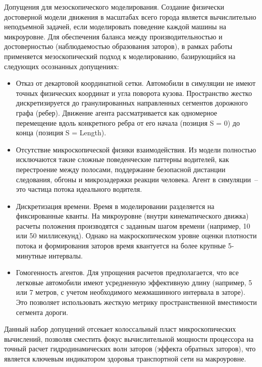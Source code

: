 Допущения для мезоскопического моделирования.
Создание физически достоверной модели движения в масштабах всего города является вычислительно неподъемной задачей, если моделировать поведение каждой машины на микроуровне. Для обеспечения баланса между производительностью и достоверностью (наблюдаемостью образования заторов), в рамках работы применяется мезоскопический подход к моделированию, базирующийся на следующих осознанных допущениях:

\begin{itemize}
    \item Отказ от декартовой координатной сетки. Автомобили в симуляции не имеют точных физических координат и угла поворота кузова. Пространство жестко дискретизируется до гранулированных направленных сегментов дорожного графа (ребер). Движение агента рассматривается как одномерное перемещение вдоль конкретного ребра от его начала (позиция S = 0) до конца (позиция S = Length).
    \item Отсутствие микроскопической физики взаимодействия. Из модели полностью исключаются такие сложные поведенческие паттерны водителей, как перестроение между полосами, поддержание безопасной дистанции следования, обгоны и микрозадержки реакции человека. Агент в симуляции~-- это частица потока идеального водителя.
    \item Дискретизация времени. Время в моделировании разделяется на фиксированные кванты. На микроуровне (внутри кинематического движка) расчеты положения производятся с заданным шагом времени (например, 10 или 50 миллисекунд). Однако на макроскопическом уровне оценки плотности потока и формирования заторов время квантуется на более крупные 5-минутные интервалы.
    \item Гомогенность агентов. Для упрощения расчетов предполагается, что все легковые автомобили имеют усредненную эффективную длину (например, 5 или 7 метров, с учетом необходимого межмашинного интервала в заторе). Это позволяет использовать жесткую метрику пространственной вместимости сегмента дороги.
\end{itemize}

Данный набор допущений отсекает колоссальный пласт микроскопических вычислений, позволяя сместить фокус вычислительной мощности процессора на точный расчет гидродинамических волн заторов (эффекта обратных заторов), что является ключевым индикатором здоровья транспортной сети на макроуровне.
